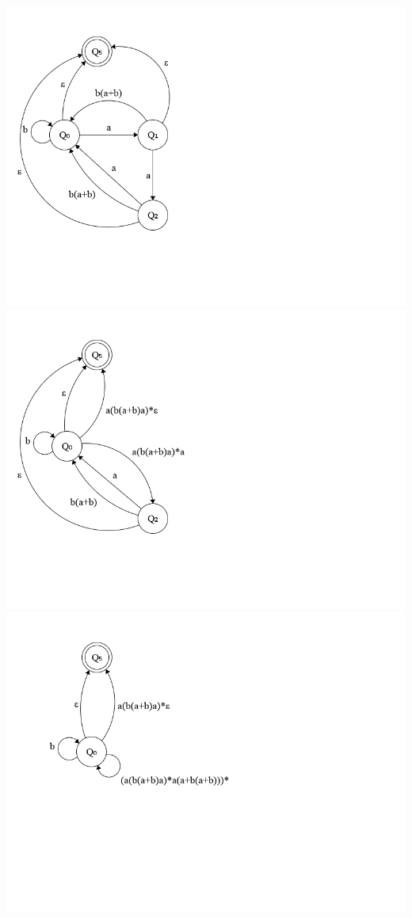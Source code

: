 \documentclass{article}
\begin{document}
\begin{enumerate}
			\includegraphics[width=\textwidth]{p1_C_reduced_2.png}\\
			\includegraphics[width=\textwidth]{p1_C_reduced_3.png}\\
			\includegraphics[width=\textwidth]{p1_C_reduced_4.png}\\


\end{enumerate}
\end{document}
